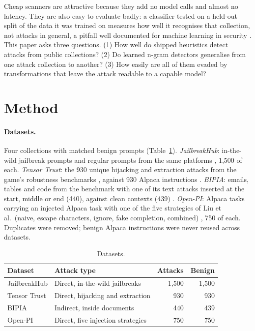 \documentclass[11pt]{article}
\begin{document}
Cheap scanners are attractive because they add no model calls and almost no latency. They are also easy to evaluate badly:
a classifier tested on a held-out split of the data it was trained on measures how well it recognises that collection, not
attacks in general, a pitfall well documented for machine learning in security \cite{arp2022dos}. This paper asks three
questions. (1) How well do shipped heuristics detect attacks from public collections? (2) Do learned n-gram detectors
generalise from one attack collection to another? (3) How easily are all of them evaded by transformations that leave the
attack readable to a capable model?

\section{Method}
\paragraph{Datasets.} Four collections with matched benign prompts (Table~\ref{tab:data}).
\emph{JailbreakHub}: in-the-wild jailbreak prompts and regular prompts from the same platforms \cite{shen2024dan}, 1{,}500
of each. \emph{Tensor Trust}: the 930 unique hijacking and extraction attacks from the game's robustness benchmarks
\cite{toyer2024tensortrust}, against 930 Alpaca instructions \cite{taori2023alpaca}. \emph{BIPIA}: emails, tables and code from the
benchmark with one of its text attacks inserted at the start, middle or end (440), against clean contexts (439)
\cite{yi2023bipia}. \emph{Open-PI}: Alpaca tasks carrying an injected Alpaca task with one of the five strategies of
Liu et al.\ (naive, escape characters, ignore, fake completion, combined) \cite{liu2024formalizing}, 750 of each. Duplicates
were removed; benign Alpaca instructions were never reused across datasets.

\begin{table}[t]
\centering
\caption{Datasets.}
\label{tab:data}
\footnotesize
\begin{tabular}{llrr}
\toprule
Dataset & Attack type & Attacks & Benign \\
\midrule
JailbreakHub & Direct, in-the-wild jailbreaks & 1{,}500 & 1{,}500 \\
Tensor Trust & Direct, hijacking and extraction & 930 & 930 \\
BIPIA & Indirect, inside documents & 440 & 439 \\
Open-PI & Direct, five injection strategies & 750 & 750 \\
\bottomrule
\end{tabular}
\end{table}
\end{document}
